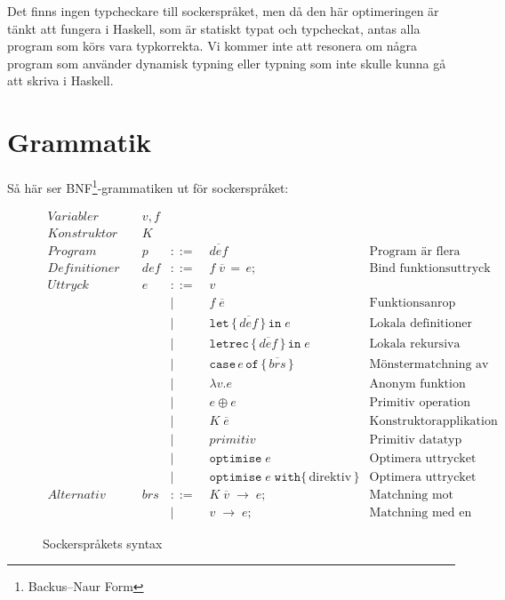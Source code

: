 \documentclass[Rapport]{subfiles}
\begin{document}
Det finns ingen typcheckare till sockerspråket, men då den här optimeringen
är tänkt att fungera i Haskell, som är statiskt typat och typcheckat, antas
alla program som körs vara typkorrekta. Vi kommer inte att resonera om några program
som använder dynamisk typning eller typning som inte skulle kunna gå
att skriva i Haskell.

\section{Grammatik}

Så här ser BNF\footnote{Backus–Naur Form}-grammatiken ut för sockerspråket:

\begin{figure}[H]
\begin{equation*}
\begin{aligned}
Variabler \quad & v,f \\
Konstruktor \quad & K \\
Program \quad& p &::=&\; \overline{def} 
        & \text{Program är flera definitioner}\\ 
Definitioner  \quad & def & ::=&\; f \; \overline{v} \, \mathtt{=} \, e \mathtt{;} 
        & \text {Bind funktionsuttryck}\\
Uttryck \quad & e &::=&\;  v \\
       &&|&\; f \; \overline{e}  
            & \text{Funktionsanrop} \\ 
       &&|&\; \mathtt{let \, \{} \, \overline{def} \, \mathtt{\} \, in }\; e 
            & \text{Lokala definitioner}\\
       &&|&\; \mathtt{letrec \, \{} \, \overline{def} \, \mathtt{\} \, in } \; e 
            & \text{Lokala rekursiva definitioner} \\
       &&|&\; \mathtt{case} \, e \, \mathtt{of \, \{} \, \overline{brs} \, \mathtt{\}} 
            & \text{Mönstermatchning av uttryck} \\
       &&|&\; \mathtt{\lambda } v \mathtt{.} e
            & \text{Anonym funktion} \\
       &&|&\; e \oplus e 
            & \text{Primitiv operation}\\ 
       &&|&\; K \; \overline{e} 
            & \text{Konstruktorapplikation} \\
       &&|&\; primitiv 
            & \text{Primitiv datatyp} \\
       &&|&\; \mathtt{optimise} \; e 
            & \text{Optimera uttrycket} \\
       &&|&\; \mathtt{optimise } \; e \; \mathtt{ with \{} \, \text{direktiv} \, \} 
            & \text{Optimera uttrycket} \\
Alternativ \quad & brs &::=&\; K \; \overline{v} \; \mathtt{\rightarrow} \; e \mathtt{;} 
            & \text{Matchning mot konstruktor} \\
         &&|&\; v \; \mathtt{\rightarrow} \; e \mathtt{;}
            & \text{Matchning med en variabel}
\end{aligned}
\end{equation*}
\caption{Sockerspråkets syntax}
\end{figure}
\end{document}
